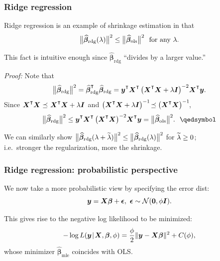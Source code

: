 \documentclass[18pt, handout]{beamer}
\newcommand{\defineTightSpacing}{%
	\setlength{\abovedisplayskip}{.25\baselineskip}%
	\setlength{\belowdisplayskip}{.25\baselineskip}%
}
\renewcommand{\textsc}[1]{{\small \MakeUppercase{#1}}}
\newcommand{\given}{\thinnerspace | \thinnerspace}
\newcommand{\transpose}{\text{\raisebox{.5ex}{$\intercal$}}}
\newcommand{\higherTranspose}{\text{\raisebox{.9ex}{$\intercal$}}}
\newcommand{\thinnerspace}{\mskip.5\thinmuskip}
\newcommand{\normalDist}{\mathcal{N}}
\newcommand{\mle}[1]{\widehat{#1}_{\textrm{mle}}}
\newcommand{\likelihood}{L}
\newcommand{\by}{\bm{y}}
\newcommand{\bX}{\bm{X}}
\newcommand{\bbeta}{\bm{\beta}}
\newcommand{\Id}{\bm{I}}
\begin{document}
\begin{frame}
\frametitle{Ridge regression}
Ridge regression is an example of shrinkage estimation in that
\begin{equation*} \defineTightSpacing%
\big\| \widehat{\bbeta}_{\mathrm{rdg}}(\penaltyParam) \big\|^2
	\leq \big\| \widehat{\bbeta}_{\mathrm{ols}} \big\|^2
	\ \text{ for any } \penaltyParam.
\end{equation*}

This fact is intuitive enough since $\widehat{\bbeta}_{\mathrm{rdg}}$ ``divides by a larger value.''

\textit{Proof:} Note that
\begin{equation*} \defineTightSpacing%
\big\| \widehat{\bbeta}_{\mathrm{rdg}} \big\|^2
	= \widehat{\bbeta}_{\mathrm{rdg}}^\higherTranspose \widehat{\bbeta}_{\mathrm{rdg}}
	= \by^\transpose \bX^\transpose \left( \bX^\transpose \bX + \lambda \Id \right)^{-2} \! \bX^\transpose \by.
\end{equation*}
Since $\bX^\transpose \bX \preceq \thinnerspace \bX^\transpose \bX + \lambda \Id \thinnerspace$ and $\left( \bX^\transpose \bX + \lambda \Id \right)^{-1}\! \preceq \left( \bX^\transpose \bX \right)^{-1}\!$, 
\begin{equation*} \defineTightSpacing%
\big\| \widehat{\bbeta}_{\mathrm{rdg}} \big\|^2
	\leq \by^\transpose \bX^\transpose \left( \bX^\transpose \bX \right)^{-2} \! \bX^\transpose \by
	= \big\| \widehat{\bbeta}_{\mathrm{ols}} \big\|^2. \hspace{1.5ex} \qedsymbol
\end{equation*}

\smallskip
We can similarly show 
$\big\| \widehat{\bbeta}_{\mathrm{rdg}}(\penaltyParam + \widetilde{\penaltyParam}) \big\|^2 
	\leq \big\| \widehat{\bbeta}_{\mathrm{rdg}}(\penaltyParam) \big\|^2$ 
for $\widetilde{\lambda} \geq 0$; \\
i.e.\ stronger the regularization, more the shrinkage.
\end{frame}


\begin{frame}
\frametitle{Ridge regression: probabilistic perspective}
We now take a more probabilistic view by specifying the error dist:
\begin{equation*} \defineTightSpacing%
\by = \bX \bbeta + \bm{\epsilon},
	\ \bm{\epsilon} \sim \normalDist(\bm{0}, \phi \Id).
\end{equation*}

This gives rise to the negative log likelihood to be minimized:
\begin{equation*} \defineTightSpacing%
- \log \likelihood(\by \given \bX, \bbeta, \phi)
	= \frac{\phi}{2} \| \by - \bX \bbeta \|^2 + C(\phi),
\end{equation*}
whose minimizer $\mle{\bbeta}$ coincides with \textsc{OLS}.
\end{frame}
\end{document}
